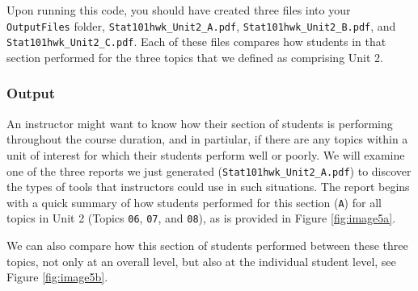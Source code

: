 \documentclass{article}\usepackage[]{graphicx}\usepackage[]{color}
\numberwithin{equation}{section} %
\begin{document}
Upon running this code, you should have created three files into your \texttt{OutputFiles} folder, \texttt{Stat101hwk\_Unit2\_A.pdf}, \texttt{Stat101hwk\_Unit2\_B.pdf}, and \texttt{Stat101hwk\_Unit2\_C.pdf}. Each of these files compares how students in that section performed for the three topics that we defined as comprising Unit 2.

\subsubsection{Output}

An instructor might want to know how their section of students is performing throughout the course duration, and in partiular, if there are any topics within a unit of interest for which their students perform well or poorly. We will examine one of the three reports we just generated (\texttt{Stat101hwk\_Unit2\_A.pdf}) to discover the types of tools that instructors could use in such situations. The report begins with a quick summary of how students performed for this section (\texttt{A}) for all topics in Unit 2 (Topics \texttt{06}, \texttt{07}, and \texttt{08}), as is provided in Figure \ref{fig:image5a}.

\begin{center}
\captionsetup{width=0.6\textwidth}
\label{fig:image5a}
\end{center}

We can also compare how this section of students performed between these three topics, not only at an overall level, but also at the individual student level, see Figure \ref{fig:image5b}.
\end{document}
